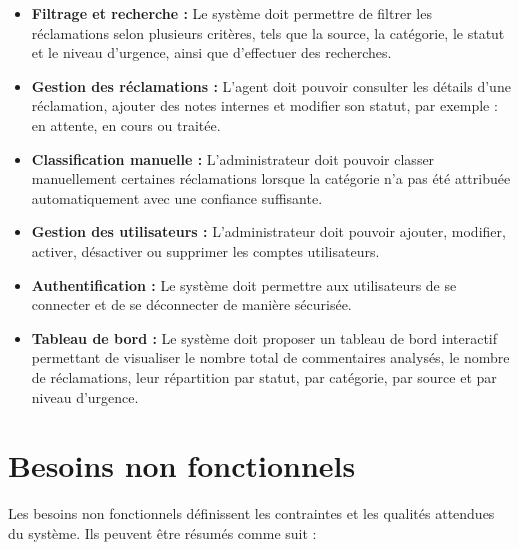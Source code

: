 \documentclass[12pt,a4paper,oneside]{report}
\begin{document}
\begin{itemize}
\item \textbf{Filtrage et recherche :}  
Le système doit permettre de filtrer les réclamations selon plusieurs critères, tels que la source, la catégorie, le statut et le niveau d’urgence, ainsi que d’effectuer des recherches.

\item \textbf{Gestion des réclamations :}  
L’agent doit pouvoir consulter les détails d’une réclamation, ajouter des notes internes et modifier son statut, par exemple : en attente, en cours ou traitée.

\item \textbf{Classification manuelle :}  
L’administrateur doit pouvoir classer manuellement certaines réclamations lorsque la catégorie n’a pas été attribuée automatiquement avec une confiance suffisante.

\item \textbf{Gestion des utilisateurs :}  
L’administrateur doit pouvoir ajouter, modifier, activer, désactiver ou supprimer les comptes utilisateurs.

\item \textbf{Authentification :}  
Le système doit permettre aux utilisateurs de se connecter et de se déconnecter de manière sécurisée.

\item \textbf{Tableau de bord :}  
Le système doit proposer un tableau de bord interactif permettant de visualiser le nombre total de commentaires analysés, le nombre de réclamations, leur répartition par statut, par catégorie, par source et par niveau d’urgence.

\end{itemize}
\section{Besoins non fonctionnels}

Les besoins non fonctionnels définissent les contraintes et les qualités attendues du système. Ils peuvent être résumés comme suit :
\end{document}

